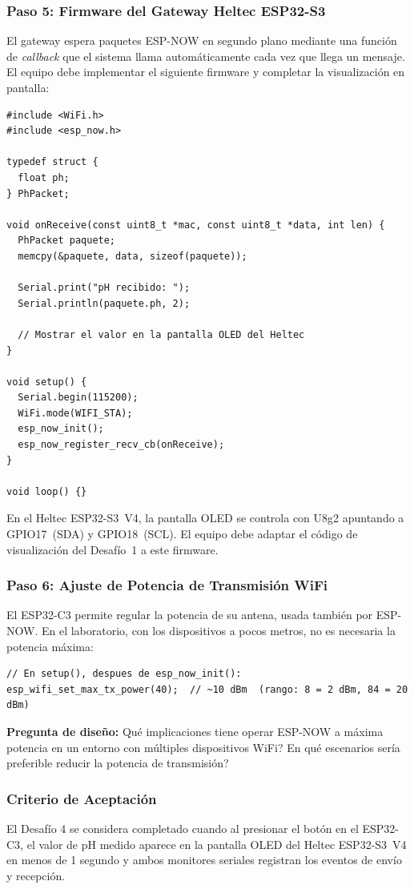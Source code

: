 \documentclass[12pt,leqno]{article}
\begin{document}
\pagebreak
\subsubsection*{Paso 5: Firmware del Gateway Heltec ESP32-S3}

El gateway espera paquetes ESP-NOW en segundo plano mediante una funci\'on de
\textit{callback} que el sistema llama autom\'aticamente cada vez que llega un
mensaje. El equipo debe implementar el siguiente firmware y completar la
visualizaci\'on en pantalla:

\begin{lstlisting}
#include <WiFi.h>
#include <esp_now.h>

typedef struct {
  float ph;
} PhPacket;

void onReceive(const uint8_t *mac, const uint8_t *data, int len) {
  PhPacket paquete;
  memcpy(&paquete, data, sizeof(paquete));

  Serial.print("pH recibido: ");
  Serial.println(paquete.ph, 2);

  // Mostrar el valor en la pantalla OLED del Heltec
}

void setup() {
  Serial.begin(115200);
  WiFi.mode(WIFI_STA);
  esp_now_init();
  esp_now_register_recv_cb(onReceive);
}

void loop() {}
\end{lstlisting}

\begin{notabox}
En el Heltec ESP32-S3~V4, la pantalla OLED se controla con U8g2 apuntando a
GPIO17~(SDA) y GPIO18~(SCL). El equipo debe adaptar el c\'odigo de visualizaci\'on
del Desaf\'io~1 a este firmware.
\end{notabox}

\subsubsection*{Paso 6: Ajuste de Potencia de Transmisi\'on WiFi}

El ESP32-C3 permite regular la potencia de su antena, usada tambi\'en por ESP-NOW.
En el laboratorio, con los dispositivos a pocos metros, no es necesaria la potencia
m\'axima:

\begin{lstlisting}
// En setup(), despues de esp_now_init():
esp_wifi_set_max_tx_power(40);  // ~10 dBm  (rango: 8 = 2 dBm, 84 = 20 dBm)
\end{lstlisting}

\noindent\textbf{Pregunta de dise\~no:} \textquestiondown Qu\'e implicaciones tiene
operar ESP-NOW a m\'axima potencia en un entorno con m\'ultiples dispositivos WiFi?
\textquestiondown En qu\'e escenarios ser\'ia preferible reducir la potencia de
transmisi\'on?

\subsubsection*{Criterio de Aceptaci\'on}

El Desaf\'io 4 se considera completado cuando al presionar el bot\'on en el
ESP32-C3, el valor de pH medido aparece en la pantalla OLED del Heltec
ESP32-S3~V4 en menos de 1 segundo y ambos monitores seriales registran los eventos
de env\'io y recepci\'on.
\end{document}
